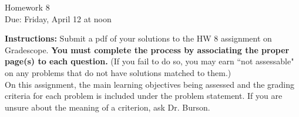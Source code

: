 \documentclass[12pt]{article}
\begin{document}
\begin{center}
{\Large Homework 8}\\
Due: Friday,  April 12 at noon\\


\end{center}
{\bf Instructions:} Submit a pdf of your solutions to the HW 8 assignment on Gradescope.  {\bf You must complete the process by associating the proper page(s) to each question.} (If you fail to do so, you may earn ``not assessable" on any problems that do not have solutions matched to them.)\\[3pt]

On this assignment, the main learning objectives being assessed and the grading criteria for each problem is included under the problem statement.  If you are unsure about the meaning of a criterion, ask Dr. Burson.  
\end{document}
